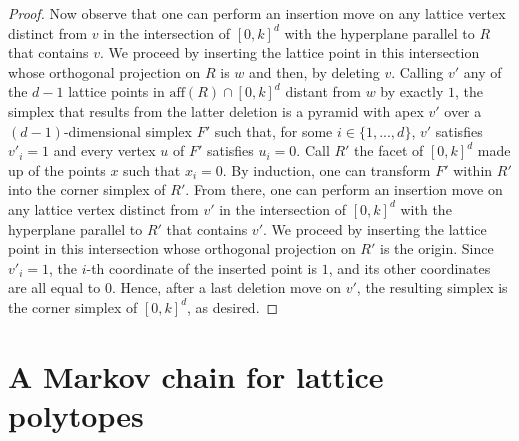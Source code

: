 \documentclass[a4paper]{article}
\begin{document}
\begin{proof}
Now observe that one can perform an insertion move on any lattice vertex distinct from $v$ in the intersection of $[0,k]^d$ with the hyperplane parallel to $R$ that contains $v$. We proceed by inserting the lattice point in this intersection whose orthogonal projection on $R$ is $w$ and then, by deleting $v$. Calling $v'$ any of the $d-1$ lattice points in $\mathrm{aff}(R)\cap[0,k]^d$ distant from $w$ by exactly $1$, the simplex that results from the latter deletion is a pyramid with apex $v'$ over a $(d-1)$-dimensional simplex $F'$ such that, for some $i\in\{1, ..., d\}$, $v'$ satisfies $v'_i=1$ and every vertex $u$ of $F'$ satisfies $u_i=0$. Call $R'$ the facet of $[0,k]^d$ made up of the points $x$ such that $x_i=0$. By induction, one can transform $F'$ within $R'$ into the corner simplex of $R'$. From there, one can perform an insertion move on any lattice vertex distinct from $v'$ in the intersection of $[0,k]^d$ with the hyperplane parallel to $R'$ that contains $v'$. We proceed by inserting the lattice point in this intersection whose orthogonal projection on $R'$ is the origin. Since $v'_i=1$, the $i$-th coordinate of the inserted point is $1$, and its other coordinates are all equal to $0$. Hence, after a last deletion move on $v'$, the resulting simplex is the corner simplex of $[0,k]^d$, as desired.
\end{proof}

\section{A Markov chain for lattice polytopes}\label{sec.Markov}

\end{document}
